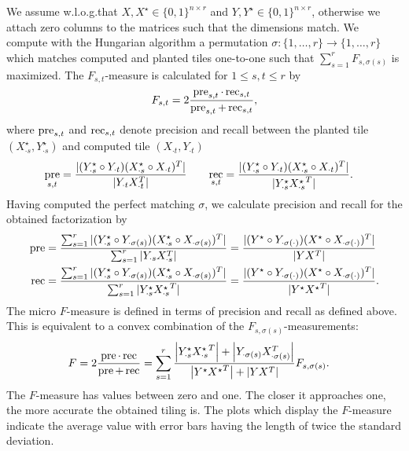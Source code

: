 We assume w.l.o.g.\@ that $X,X^\star\in\{0,1\}^{n\times r}$ and $Y,Y^\star\in\{0,1\}^{n\times r}$, otherwise we attach zero columns to the matrices such that the dimensions match. 
We compute with the Hungarian algorithm a permutation $\sigma:\{1,\ldots, r\}\rightarrow \{1,\ldots,r\}$ which matches computed and planted tiles one-to-one such that $\sum_{s=1}^rF_{s,\sigma(s)}$ is maximized. The $F_{s,t}$-measure is calculated for $1\leq s,t\leq r$ by  
\[
	F_{s,t}=2\frac{\operatorname*{pre}_{s,t}\cdot\operatorname*{rec}_{s,t}}{\operatorname*{pre}_{s,t}+\operatorname*{rec}_{s,t}},
\]
where $\operatorname*{pre}_{s,t}$ and $\operatorname*{rec}_{s,t}$ denote precision and recall between the planted tile $(X^\star_{\cdot s},Y^\star_{\cdot s})$ and computed tile $(X_{\cdot t},Y_{\cdot t})$
\begin{align*}
	\operatorname*{pre}_{s,t} &= \frac{|(Y^\star_{\cdot s}\circ Y_{\cdot t})(X^\star_{\cdot s}\circ X_{\cdot t})^T|}{|Y_{\cdot t}X_{\cdot t}^T|} &\quad 
    \operatorname*{rec}_{s,t} &= \frac{|(Y^\star_{\cdot s}\circ Y_{\cdot t})(X^\star_{\cdot s}\circ X_{\cdot t})^T|}{|Y^\star_{\cdot s}{X^\star_{\cdot s}}^T|}.  
\end{align*}
Having computed the perfect matching $\sigma$, we calculate precision and recall for the obtained factorization by
\begin{align*}
\operatorname*{pre} &= \frac{\sum_{s=1}^r|(Y^\star_{\cdot s}\circ Y_{\cdot \sigma(s)})(X^\star_{\cdot s}\circ X_{\cdot \sigma(s)})^T|}{\sum_{s=1}^r|Y_{\cdot s}X_{\cdot s}^T|} 
= \frac{|(Y^\star\circ Y_{\cdot \sigma(\cdot)})(X^\star\circ X_{\cdot \sigma(\cdot)})^T|}{|YX^T|}\\ 
\operatorname*{rec} &= \frac{\sum_{s=1}^r|(Y^\star_{\cdot s}\circ Y_{\cdot \sigma(s)})(X^\star_{\cdot s}\circ X_{\cdot \sigma(s)})^T|}{\sum_{s=1}^r|Y_{\cdot s}^\star {X_{\cdot s}^\star}^T|} 
    = \frac{|(Y^\star\circ Y_{\cdot\sigma(\cdot)})(X^\star\circ X_{\cdot \sigma(\cdot)})^T|}{|Y^\star{X^\star}^T|}.
\end{align*}
The micro $F$-measure is defined in terms of precision and recall as defined above. This is equivalent to a convex combination of the $F_{s,\sigma(s)}$-measurements:  
\begin{align*}
	F&=2\frac{\operatorname*{pre}\cdot\operatorname*{rec}}{\operatorname*{pre}+\operatorname*{rec}}
    = \sum_{s=1}^r\frac{\left|Y^\star_{\cdot s}{X^\star_{\cdot s}}^T\right| + \left|Y_{\cdot\sigma(s)}X_{\cdot\sigma(s)}^T\right|}{\left|Y^\star {X^\star}^T\right|+\left|Y X^T\right|}F_{s,\sigma(s)}.
\end{align*}
The $F$-measure has values between zero and one. The closer it approaches one, the more accurate the obtained tiling is. The plots which display the $F$-measure indicate the average value with error bars having the length of twice the standard deviation.

